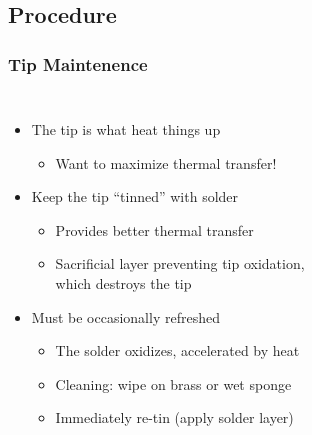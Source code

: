 \documentclass{beamer}
\begin{document}
\subsection{Procedure}
\begin{frame}
\frametitle{Tip Maintenence}
\begin{columns}[t]
\begin{itemize}
  \item The tip is what heat things up
  \begin{itemize}
    \item Want to maximize thermal transfer!
  \end{itemize}
  \item Keep the tip ``tinned'' with solder
  \begin{itemize}
    \item Provides better thermal transfer
    \item Sacrificial layer preventing tip oxidation, \\
    which destroys the tip
  \end{itemize}
  \item Must be occasionally refreshed
  \begin{itemize}
    \item The solder oxidizes, accelerated by heat
    \item Cleaning: wipe on brass or wet sponge
    \item Immediately re-tin (apply solder layer)
  \end{itemize}
\end{itemize}

\begin{figure}
\centering
\end{figure}
\end{columns}
\end{frame}
\end{document}
